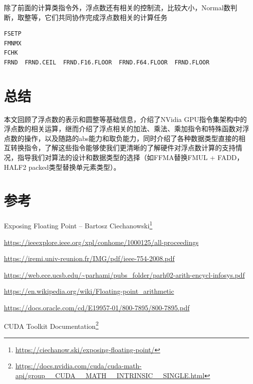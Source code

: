 除了前面的计算类指令外，浮点数还有相关的控制流，比较大小，Normal数判断，取整等，它们共同协作完成浮点数相关的计算任务

\begin{lstlisting}
FSETP
FMNMX
FCHK
FRND  FRND.CEIL  FRND.F16.FLOOR  FRND.F64.FLOOR  FRND.FLOOR
\end{lstlisting}

\section{总结}

本文回顾了浮点数的表示和圆整等基础信息，介绍了NVidia GPU指令集架构中的浮点数的相关运算，继而介绍了浮点相关的加法、乘法、乘加指令和特殊函数对浮点数的操作，以及随路的abs能力和取负能力，同时介绍了各种数据类型直接的相互转换指令，了解这些指令能够使我们更清晰的了解硬件对浮点数计算的支持情况，指导我们对算法的设计和数据类型的选择（如FFMA替换FMUL + FADD，HALF2 packed类型替换单元素类型）。

\section{参考}

Exposing Floating Point – Bartosz Ciechanowski\footnote{\url{https://ciechanow.ski/exposing-floating-point/}}

\url{https://ieeexplore.ieee.org/xpl/conhome/1000125/all-proceedings}

\url{https://iremi.univ-reunion.fr/IMG/pdf/ieee-754-2008.pdf}

\url{https://web.ece.ucsb.edu/~parhami/pubs_folder/parh02-arith-encycl-infosys.pdf}

\url{https://en.wikipedia.org/wiki/Floating-point_arithmetic}

\url{https://docs.oracle.com/cd/E19957-01/800-7895/800-7895.pdf}

CUDA Toolkit Documentation\footnote{\url{https://docs.nvidia.com/cuda/cuda-math-api/group__CUDA__MATH__INTRINSIC__SINGLE.html}}
